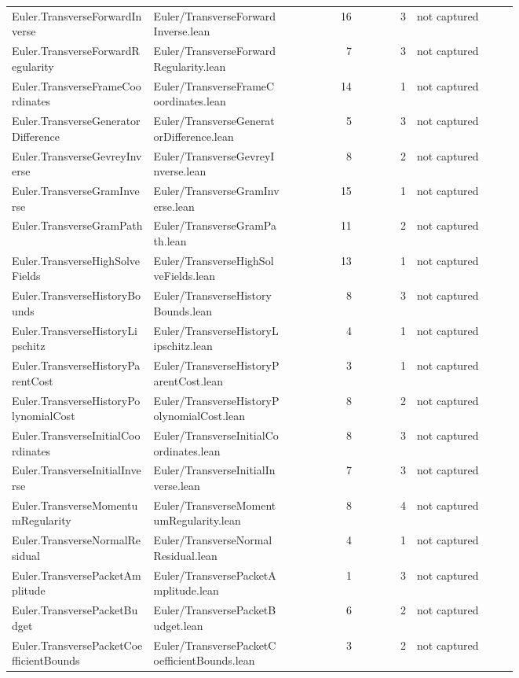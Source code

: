\documentclass[10pt]{article}
\begin{document}
\begin{longtable}{p{0.28\linewidth}p{0.27\linewidth}r r p{0.20\linewidth}}
Euler.TransverseForwardInverse & Euler/TransverseForwardInverse.lean & 16 & 3 & not captured\\
Euler.TransverseForwardRegularity & Euler/TransverseForwardRegularity.lean & 7 & 3 & not captured\\
Euler.TransverseFrameCoordinates & Euler/TransverseFrameCoordinates.lean & 14 & 1 & not captured\\
Euler.TransverseGeneratorDifference & Euler/TransverseGeneratorDifference.lean & 5 & 3 & not captured\\
Euler.TransverseGevreyInverse & Euler/TransverseGevreyInverse.lean & 8 & 2 & not captured\\
Euler.TransverseGramInverse & Euler/TransverseGramInverse.lean & 15 & 1 & not captured\\
Euler.TransverseGramPath & Euler/TransverseGramPath.lean & 11 & 2 & not captured\\
Euler.TransverseHighSolveFields & Euler/TransverseHighSolveFields.lean & 13 & 1 & not captured\\
Euler.TransverseHistoryBounds & Euler/TransverseHistoryBounds.lean & 8 & 3 & not captured\\
Euler.TransverseHistoryLipschitz & Euler/TransverseHistoryLipschitz.lean & 4 & 1 & not captured\\
Euler.TransverseHistoryParentCost & Euler/TransverseHistoryParentCost.lean & 3 & 1 & not captured\\
Euler.TransverseHistoryPolynomialCost & Euler/TransverseHistoryPolynomialCost.lean & 8 & 2 & not captured\\
Euler.TransverseInitialCoordinates & Euler/TransverseInitialCoordinates.lean & 8 & 3 & not captured\\
Euler.TransverseInitialInverse & Euler/TransverseInitialInverse.lean & 7 & 3 & not captured\\
Euler.TransverseMomentumRegularity & Euler/TransverseMomentumRegularity.lean & 8 & 4 & not captured\\
Euler.TransverseNormalResidual & Euler/TransverseNormalResidual.lean & 4 & 1 & not captured\\
Euler.TransversePacketAmplitude & Euler/TransversePacketAmplitude.lean & 1 & 3 & not captured\\
Euler.TransversePacketBudget & Euler/TransversePacketBudget.lean & 6 & 2 & not captured\\
Euler.TransversePacketCoefficientBounds & Euler/TransversePacketCoefficientBounds.lean & 3 & 2 & not captured\\

\end{longtable}
\end{document}
